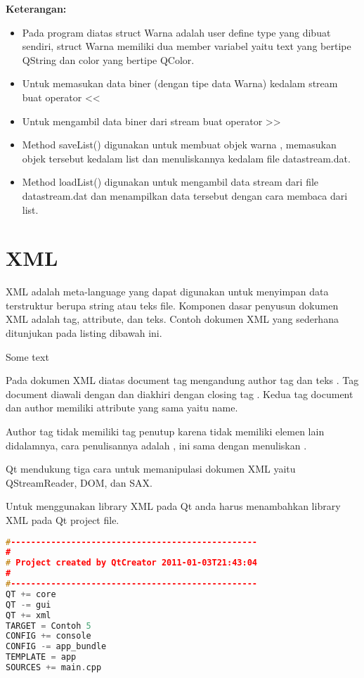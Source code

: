 \textbf{Keterangan:}

\begin{itemize}

\item
  Pada program diatas struct Warna adalah user define type yang dibuat
  sendiri, struct Warna memiliki dua member variabel yaitu text yang
  bertipe QString dan color yang bertipe QColor.
\item
  Untuk memasukan data biner (dengan tipe data Warna) kedalam stream
  buat operator \textless{}\textless{}
\item
  Untuk mengambil data biner dari stream buat operator
  \textgreater{}\textgreater{}
\item
  Method saveList() digunakan untuk membuat objek warna , memasukan
  objek tersebut kedalam list dan menuliskannya kedalam file
  datastream.dat.
\item
  Method loadList() digunakan untuk mengambil data stream dari file
  datastream.dat dan menampilkan data tersebut dengan cara membaca dari
  list.
\end{itemize}

\section{XML}\label{xml}

XML adalah meta-language yang dapat digunakan untuk menyimpan data
terstruktur berupa string atau teks file. Komponen dasar penyusun
dokumen XML adalah tag, attribute, dan teks. Contoh dokumen XML yang
sederhana ditunjukan pada listing dibawah ini.

 Some text

Pada dokumen XML diatas document tag mengandung author tag dan teks .
Tag document diawali dengan dan diakhiri dengan closing tag . Kedua tag
document dan author memiliki attribute yang sama yaitu name.

Author tag tidak memiliki tag penutup karena tidak memiliki elemen lain
didalamnya, cara penulisannya adalah , ini sama dengan menuliskan .

Qt mendukung tiga cara untuk memanipulasi dokumen XML yaitu
QStreamReader, DOM, dan SAX.

Untuk menggunakan library XML pada Qt anda harus menambahkan library XML
pada Qt project file.

\begin{lstlisting}[language=c++, numbers=none]
#-------------------------------------------------
#
# Project created by QtCreator 2011-01-03T21:43:04
#
#-------------------------------------------------
QT += core
QT -= gui
QT += xml
TARGET = Contoh 5
CONFIG += console
CONFIG -= app_bundle
TEMPLATE = app
SOURCES += main.cpp
\end{lstlisting}

